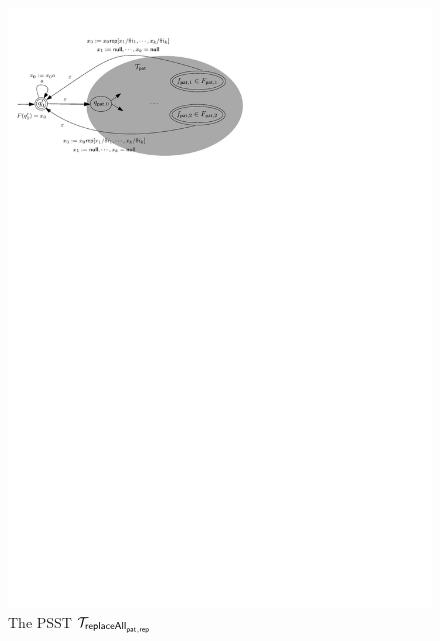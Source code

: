 \begin{figure}[ht]
    \centering
    \includegraphics[scale=0.9]{psst-replaceall.pdf}
    \caption{The PSST $\mathcal{T}_{\mathsf{replaceAll}_{\mathsf{pat},\mathsf{rep}}}$}
    \label{fig-psst-replaceall}
\end{figure}


